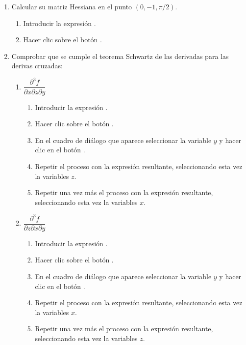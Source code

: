 \begin{enumerate}[leftmargin=*]
\begin{enumerate}
\item Calcular su matriz Hessiana en el punto $(0,-1,\pi/2)$.
\begin{indicacion}{
\begin{enumerate}
\item Introducir la expresión .
\item Hacer clic sobre el botón .
\end{enumerate}
}
\end{indicacion}

\item Comprobar que se cumple el teorema Schwartz de las derivadas para las derivas cruzadas:
\begin{enumerate}
\item $\dfrac{{\partial ^3 f}} {{\partial x\partial z\partial y}}$
\begin{indicacion}
{\begin{enumerate}
\item Introducir la expresión .
\item Hacer clic sobre el botón .
\item En el cuadro de diálogo que aparece seleccionar la variable $y$ y hacer clic en el botón .
\item Repetir el proceso con la expresión resultante, seleccionando esta vez la variables $z$.
\item Repetir una vez más el proceso con la expresión resultante, seleccionando esta vez la variables $x$.
\end{enumerate}
}
\end{indicacion}

\item $\dfrac{{\partial ^3 f}} {{\partial z\partial x\partial y}}$
\begin{indicacion}
{\begin{enumerate}
\item Introducir la expresión .
\item Hacer clic sobre el botón .
\item En el cuadro de diálogo que aparece seleccionar la variable $y$ y hacer clic en el botón .
\item Repetir el proceso con la expresión resultante, seleccionando esta vez la variables $x$.
\item Repetir una vez más el proceso con la expresión resultante, seleccionando esta vez la variables $z$.
\end{enumerate}
}
\end{indicacion}
\end{enumerate}


\end{enumerate}
\end{enumerate}
